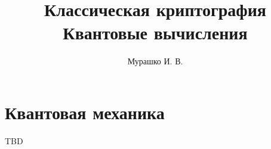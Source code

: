 \documentclass[10pt,pdf,hyperref={unicode}]{beamer}
\title[Криптография и квантовые вычисления]{Классическая
  криптография\\Квантовые вычисления}
\author{Мурашко И. В.}
\institute{Санкт Петербургский Государственный Политехнический Университет}
\date{}
\begin{document}
\begin{frame}
\titlepage
\end{frame}

%



\section{Квантовая механика}
\begin{frame}
TBD
\end{frame}


\end{document}
